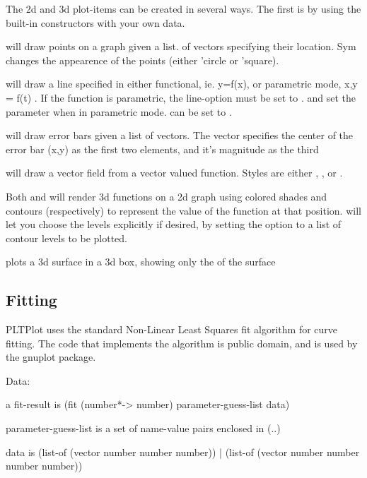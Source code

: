 \documentclass{article}
\begin{document}
{The 2d and 3d plot-items can be created in several ways. The first is by using the built-in constructors with your own data. 


 will draw points on a graph given a list. of vectors specifying their location. Sym changes the appearence of the points (either 'circle or 'square).


 will draw a line specified in either functional, ie. y=f(x), or  parametric mode, x,y = f(t) . If the function is parametric, the line-option  must be set to .  and  set the parameter when in parametric mode.  can be set to .


 will draw error bars given a list of vectors. The vector specifies the  center of the error bar (x,y) as the first two elements, and it's magnitude as the third


 will draw a vector field from a vector valued function. Styles are either , , or . 


Both  and  will render 3d functions on a 2d graph using colored shades and contours (respectively) to represent the value of the function at that position.  will let you choose the levels explicitly if desired, by setting the  option to a list of contour levels to be plotted.

 plots a 3d surface in a 3d box, showing only the  of the surface

\subsection{Fitting}
\label{Fitting}


PLTPlot uses the standard Non-Linear Least Squares fit algorithm for curve fitting. The code that implements the algorithm is public domain, and is used by the gnuplot package.



\begin{schemedisplay}

Data:

a fit-result is
  (fit (number*-> number) parameter-guess-list  data)


parameter-guess-list is a set of name-value pairs enclosed in (..)

data is
  (list-of (vector number number number))
| (list-of (vector number number number number))


\end{schemedisplay}}
\end{document}
